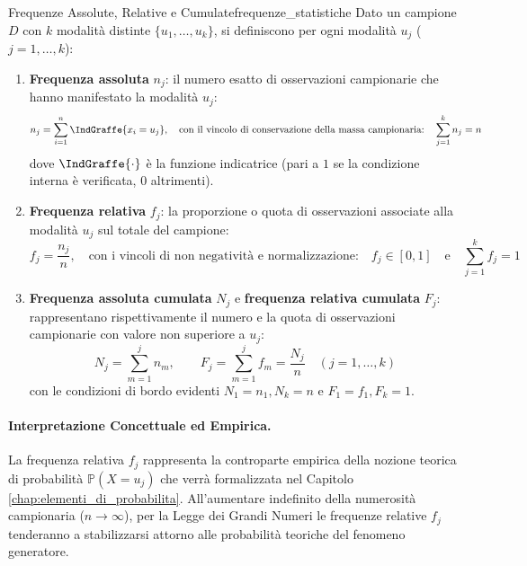 \begin{definizione}{Frequenze Assolute, Relative e Cumulate}{frequenze_statistiche}
Dato un campione $D$ con $k$ modalità distinte $\{u_1, \dots, u_k\}$, si definiscono per ogni modalità $u_j$ ($j=1,\dots,k$):
\begin{enumerate}
    \item \textbf{Frequenza assoluta} $n_j$: il numero esatto di osservazioni campionarie che hanno manifestato la modalità $u_j$:
    \begin{equation}
    n_j = \sum_{i=1}^n \IndGraffe{x_i = u_j}, \quad \text{con il vincolo di conservazione della massa campionaria:} \quad \sum_{j=1}^k n_j = n
    \end{equation}
    dove $\IndGraffe{\cdot}$ è la funzione indicatrice (pari a $1$ se la condizione interna è verificata, $0$ altrimenti).
    \item \textbf{Frequenza relativa} $f_j$: la proporzione o quota di osservazioni associate alla modalità $u_j$ sul totale del campione:
    \begin{equation}
    f_j = \frac{n_j}{n}, \quad \text{con i vincoli di non negatività e normalizzazione:} \quad f_j \in [0, 1] \quad \text{e} \quad \sum_{j=1}^k f_j = 1
    \end{equation}
    \item \textbf{Frequenza assoluta cumulata} $N_j$ e \textbf{frequenza relativa cumulata} $F_j$: rappresentano rispettivamente il numero e la quota di osservazioni campionarie con valore non superiore a $u_j$:
    \begin{equation}
    N_j = \sum_{m=1}^j n_m, \qquad F_j = \sum_{m=1}^j f_m = \frac{N_j}{n} \quad (j=1,\dots,k)
    \end{equation}
    con le condizioni di bordo evidenti $N_1 = n_1, N_k = n$ e $F_1 = f_1, F_k = 1$.
\end{enumerate}
\end{definizione}

\paragraph{Interpretazione Concettuale ed Empirica.}
La frequenza relativa $f_j$ rappresenta la controparte empirica della nozione teorica di probabilità $\mathbb{P}(X = u_j)$ che verrà formalizzata nel Capitolo \ref{chap:elementi_di_probabilita}. All'aumentare indefinito della numerosità campionaria ($n \to \infty$), per la Legge dei Grandi Numeri le frequenze relative $f_j$ tenderanno a stabilizzarsi attorno alle probabilità teoriche del fenomeno generatore.

